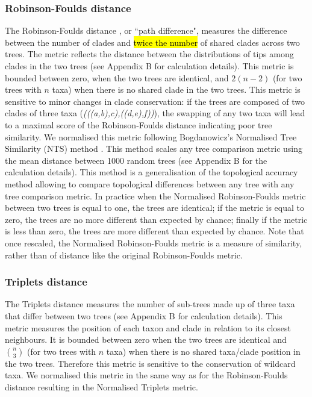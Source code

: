 \documentclass[12pt,letterpaper]{article}
\begin{document}
\subsubsection{Robinson-Foulds distance}
The Robinson-Foulds distance \citep{RF1981}, or ``path difference", measures the difference between the number of clades and \hl{twice the number} of shared clades across two trees.
The metric reflects the distance between the distributions of tips among clades in the two trees \citep{RF1981} (see Appendix B for calculation details).
This metric is bounded between zero, when the two trees are identical, and $2(n-2)$ (for two trees with $n$ taxa) when there is no shared clade in the two trees.
This metric is sensitive to minor changes in clade conservation: if the trees are composed of two clades of three taxa (\textit{(((a,b),c),((d,e),f))}), the swapping of any two taxa will lead to a maximal score of the Robinson-Foulds distance indicating poor tree similarity.
We normalised this metric following Bogdanowicz's Normalised Tree Similarity (NTS) method \citep{Bogdanowicz2012}.
This method scales any tree comparison metric using the mean distance between 1000 random trees (see Appendix B for the calculation details).
This method is a generalisation of the topological accuracy method \citep{Price2010} allowing to compare topological differences between any tree with any tree comparison metric.
In practice when the Normalised Robinson-Foulds metric between two trees is equal to one, the trees are identical; if the metric is equal to zero, the trees are no more different than expected by chance; finally if the metric is less than zero, the trees are more different than expected by chance.
Note that once rescaled, the Normalised Robinson-Foulds metric is a measure of similarity, rather than of distance like the original Robinson-Foulds metric. 

\subsubsection{Triplets distance}
The Triplets distance \citep{dobson1975triplets} measures the number of sub-trees made up of three taxa that differ between two trees \citep{critchlowthe1996} (see Appendix B for calculation details).
This metric measures the position of each taxon and clade in relation to its closest neighbours.
It is bounded between zero when the two trees are identical and $\binom{n}{3}$ (for two trees with $n$ taxa) when there is no shared taxa/clade position in the two trees.
Therefore this metric is sensitive to the conservation of wildcard taxa.
We normalised this metric in the same way as for the Robinson-Foulds distance resulting in the Normalised Triplets metric.
\end{document}
